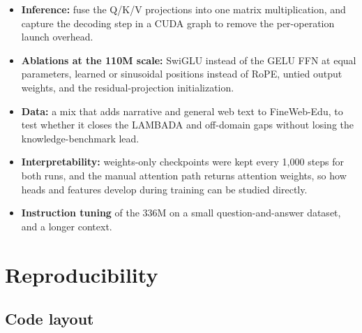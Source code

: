 \documentclass[11pt]{article}
\begin{document}
\begin{itemize}
\item \textbf{Inference:} fuse the Q/\allowbreak{}K/\allowbreak{}V projections into one matrix multiplication, and capture the decoding step in a CUDA graph to remove the per-operation launch overhead.
\item \textbf{Ablations at the 110M scale:} SwiGLU instead of the GELU FFN at equal parameters, learned or sinusoidal positions instead of RoPE, untied output weights, and the residual-projection initialization.
\item \textbf{Data:} a mix that adds narrative and general web text to FineWeb-Edu, to test whether it closes the LAMBADA and off-domain gaps without losing the knowledge-benchmark lead.
\item \textbf{Interpretability:} weights-only checkpoints were kept every 1,000 steps for both runs, and the manual attention path returns attention weights, so how heads and features develop during training can be studied directly.
\item \textbf{Instruction tuning} of the 336M on a small question-and-answer dataset, and a longer context.
\end{itemize}

\section{Reproducibility}

\subsection{Code layout}
\end{document}
